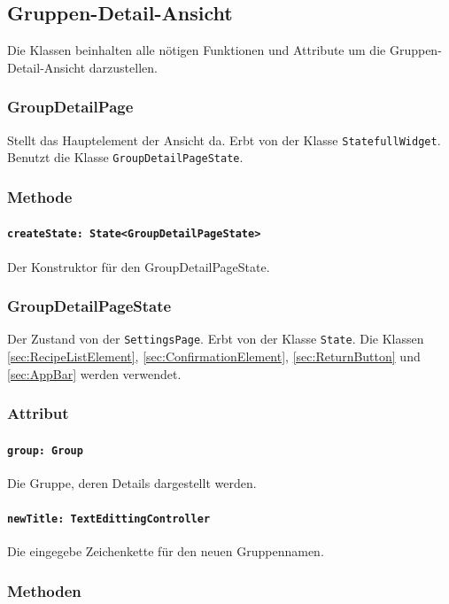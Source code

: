 \documentclass[parskip=full]{scrartcl}
\begin{document}
    \newpage

\subsection{Gruppen-Detail-Ansicht}
    Die Klassen beinhalten alle nötigen Funktionen und Attribute um die Gruppen-Detail-Ansicht darzustellen.

    \subsubsection{GroupDetailPage}
        Stellt das Hauptelement der Ansicht da. Erbt von der Klasse \texttt{StatefullWidget}. Benutzt die Klasse \texttt{GroupDetailPageState}.
        \subsubsection*{Methode}
            \paragraph*{\texttt{createState: State<GroupDetailPageState>}} Der Konstruktor für den GroupDetailPageState.

    \subsubsection{GroupDetailPageState}
        Der Zustand von der \texttt{SettingsPage}. Erbt von der Klasse \texttt{State}. Die Klassen \ref{sec:RecipeListElement}, \ref{sec:ConfirmationElement}, \ref{sec:ReturnButton} und \ref{sec:AppBar} werden verwendet.
        \subsubsection*{Attribut}
            \paragraph*{\texttt{group: Group}} Die Gruppe, deren Details dargestellt werden.
            \paragraph*{\texttt{newTitle: TextEdittingController}} Die eingegebe Zeichenkette für den neuen Gruppennamen.

        \subsubsection*{Methoden}
\end{document}
